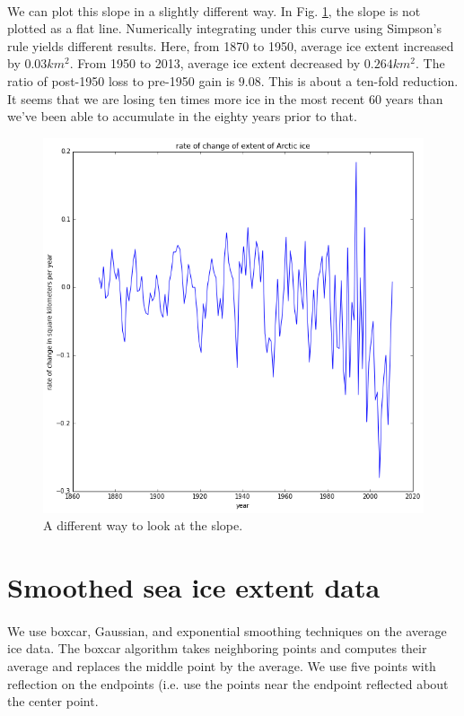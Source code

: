 \documentclass[12pt,a4paper]{article} %
\begin{document}
\paragraph{}
We can plot this slope in a slightly different way. In Fig. \ref{spiky slope}, the slope is not plotted as a flat line. Numerically integrating under this curve using Simpson's rule yields different results.  Here, from 1870 to 1950, average ice extent increased by $0.03 km^{2}$. From 1950 to 2013, average ice extent decreased by $0.264 km^{2}$. The ratio of post-1950 loss to pre-1950 gain is $9.08$. This is about a ten-fold reduction. It seems that we are losing ten times more ice in the most recent 60 years than we've been able to accumulate in  the eighty years prior to that. 

\begin{figure}[hbp]
\centering
 \includegraphics[width=0.75\linewidth]{../img/iceGradient.png}
\caption{A different way to look at the slope.}
\label{spiky slope}
\end{figure}


\section{Smoothed sea ice extent data}
\paragraph{}
We use boxcar, Gaussian, and exponential smoothing techniques on the average ice data. 
The boxcar algorithm takes neighboring points and computes their average and replaces the middle point by the average.  We use five points with reflection on the endpoints (i.e. use the points near the endpoint reflected about the center point. 
\end{document}
